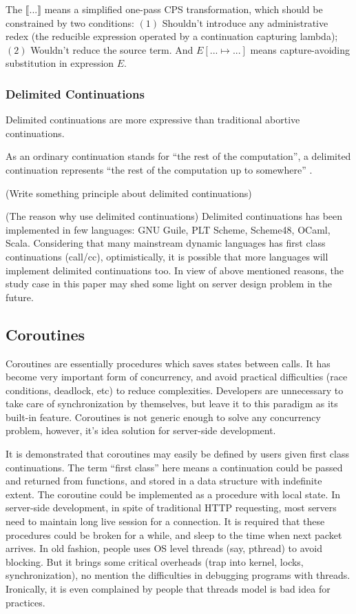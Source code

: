 \documentclass[preprint,numbers,numberedpars,10pt]{sigplanconf}
\begin{document}
The $\llbracket{...}\rrbracket$ means a simplified one-pass CPS transformation, which should be constrained by two conditions:
$(1)$ Shouldn't introduce any administrative redex (the reducible expression operated by a continuation capturing lambda);
$(2)$ Wouldn't reduce the source term. And $E[...\mapsto...]$ means capture-avoiding substitution in expression $E$.


\subsubsection{Delimited Continuations} \label{Delimited Continuations}

Delimited continuations are more expressive than traditional abortive continuations.

As an ordinary continuation stands for ``the rest of the computation'', a delimited continuation represents
``the rest of the computation up to somewhere'' \citep{sumii2000implementation}.

(Write something principle about delimited continuations)

(The reason why use delimited continuations)
Delimited continuations has been implemented in few languages: GNU Guile, PLT Scheme, Scheme48, OCaml, Scala.
Considering that many mainstream dynamic languages has first class continuations (call/cc), optimistically, it is possible that more languages
will implement delimited continuations too. In view of above mentioned reasons, the study case in this paper may shed some light on server
design problem in the future.

\subsection{Coroutines}

Coroutines are essentially procedures which saves states between calls. It has become very important form of concurrency, and avoid practical
difficulties (race conditions, deadlock, etc) to reduce complexities. Developers are unnecessary to take care of synchronization by
themselves, but leave it to this paradigm as its built-in feature. Coroutines is not generic enough to solve any concurrency problem, however,
it's idea solution for server-side development.

It is demonstrated that coroutines may easily be defined by users given first class continuations\citep{Haynes:1984:CC:800055.802046}. The
term ``first class'' here means a continuation could be passed and returned from functions, and stored in a data structure with indefinite
extent. The coroutine could be implemented as a procedure with local state. In server-side development, in spite of traditional HTTP requesting,
most servers need to maintain long live session for a connection. It is required that these procedures could be broken for a while, and sleep
to the time when next packet arrives. In old fashion, people uses OS level threads (say, pthread) to avoid blocking. But it brings some
critical overheads (trap into kernel, locks, synchronization), no mention the difficulties in debugging programs with threads. Ironically,
it is even complained by people that threads model is bad idea for practices\citep{ousterhout1996threads}.
\end{document}
